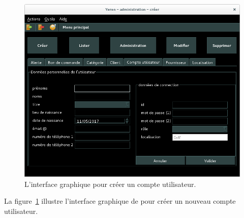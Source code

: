 
\newpage
{}

\begin{figure}[!htpb]
	\centering
	\includegraphics[scale=0.45]{images/compte-utilisateur-creer.png}
	\caption{L'interface graphique pour cr\'eer un compte utilisateur.}
	\label{fig:admin-comptes-utilisateurs-creer}
\end{figure}

La figure~\ref{fig:admin-comptes-utilisateurs-creer} illustre
l'interface graphique de \yeren pour cr\'eer un nouveau
compte utilisateur.

